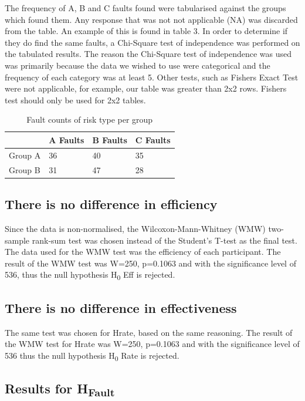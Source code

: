 \documentclass[10pt,twocolumn]{article}
\begin{document}
The frequency of A, B and C faults found were tabularised against the groups which found them. Any response that was not not applicable (NA) was discarded from the table. An example of this is found in table 3. In order to determine if they do find the same faults, a Chi-Square test of independence was performed on the tabulated results. The reason the Chi-Square test of independence was used was primarily because the data we wished to use were categorical and the frequency of each category was at least 5. Other tests, such as Fishers Exact Test were not applicable, for example, our table was greater than 2x2 rows. Fishers test should only be used for 2x2 tables.

\begin{table}
	\centering
	\begin{tabular}[Ht]{| l | l | l | l |}
	\hline
	 & A Faults & B Faults & C Faults  \\
	\hline
	Group A & 36 & 40 & 35 \\
	\hline
	Group B & 31 & 47 & 28 \\
	\hline
	\end{tabular}
	\caption{Fault counts of risk type per group}
\end{table}


\subsection{There is no difference in efficiency}
Since the data is non-normalised, the Wilcoxon-Mann-Whitney (WMW) two-sample rank-sum test was chosen instead of the Student's T-test as the final test. The data used for the WMW test was the efficiency of each participant. The result of the WMW test was W=250, p=0.1063 and with the significance level of 536, thus the null hypothesis H\textsubscript{0} Eff is rejected. 

\subsection{There is no difference in effectiveness}
The same test was chosen for Hrate, based on the same reasoning. The result of the WMW test for Hrate was W=250, p=0.1063 and with the significance level of 536 thus the null hypothesis H\textsubscript{0} Rate is rejected. 


\subsection{Results for H\textsubscript{Fault}}
\end{document}
